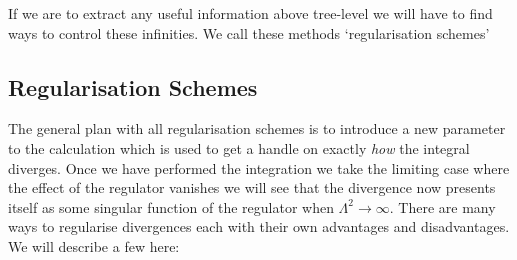 	If we are to extract any useful information above tree-level we will have to find
	ways to control these infinities.  We call these methods `regularisation schemes'

	\subsection{Regularisation Schemes}

	The general plan with all regularisation schemes is to introduce a new parameter to the calculation which
	is used to get a handle on exactly \emph{how} the integral diverges.  Once we have performed the integration
	we take the limiting case where the effect of the regulator vanishes we will see that the divergence now
	presents itself as some singular function of the regulator when $\Lambda^2\rightarrow\infty$.  There are
	many ways to regularise divergences each with their own advantages and disadvantages.  We will describe a few here:

